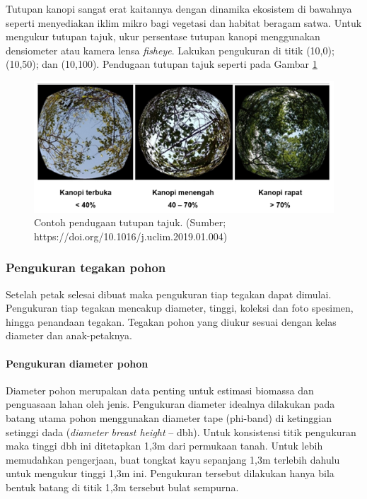 \documentclass[
]{book}
\begin{document}
Tutupan kanopi sangat erat kaitannya dengan dinamika ekosistem di bawahnya seperti menyediakan iklim mikro bagi vegetasi dan habitat beragam satwa. Untuk mengukur tutupan tajuk, ukur persentase tutupan kanopi menggunakan densiometer atau kamera lensa \emph{fisheye}. Lakukan pengukuran di titik (10,0); (10,50); dan (10,100). Pendugaan tutupan tajuk seperti pada Gambar \ref{fig:figpkv}

\begin{figure}

{\centering \includegraphics[width=1\linewidth]{images/pkv_ilustration} 

}

\caption{Contoh pendugaan tutupan tajuk. (Sumber; https://doi.org/10.1016/j.uclim.2019.01.004)}\label{fig:figpkv}
\end{figure}

\hypertarget{pengukuran-tegakan-pohon}{%
\subsubsection*{Pengukuran tegakan pohon}\label{pengukuran-tegakan-pohon}}

Setelah petak selesai dibuat maka pengukuran tiap tegakan dapat dimulai. Pengukuran tiap tegakan mencakup diameter, tinggi, koleksi dan foto spesimen, hingga penandaan tegakan. Tegakan pohon yang diukur sesuai dengan kelas diameter dan anak-petaknya.

\hypertarget{pengukuran-diameter-pohon}{%
\paragraph*{Pengukuran diameter pohon}\label{pengukuran-diameter-pohon}}

Diameter pohon merupakan data penting untuk estimasi biomassa dan penguasaan lahan oleh jenis. Pengukuran diameter idealnya dilakukan pada batang utama pohon menggunakan diameter tape (phi-band) di ketinggian setinggi dada (\emph{diameter breast height} -- dbh). Untuk konsistensi titik pengukuran maka tinggi dbh ini ditetapkan 1,3m dari permukaan tanah. Untuk lebih memudahkan pengerjaan, buat tongkat kayu sepanjang 1,3m terlebih dahulu untuk mengukur tinggi 1,3m ini. Pengukuran tersebut dilakukan hanya bila bentuk batang di titik 1,3m tersebut bulat sempurna.
\end{document}

